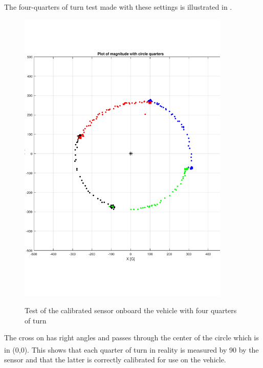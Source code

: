 The four-quarters of turn test made with these settings is illustrated in .
\begin{figure}[H]
    \centering
  {
    \includegraphics[width=0.9\textwidth]{figures/fullturn2.pdf}
  }
  \caption{Test of the calibrated sensor onboard the vehicle with four quarters of turn}
  \label{fig:calibrationTestQuarterResults}
\end{figure}

The cross on  has right angles and passes through the center of the circle which is in (0,0). This shows that each quarter of turn in reality is measured by \si{90^{\circ}} by the sensor and that the latter is correctly calibrated for use on the vehicle.